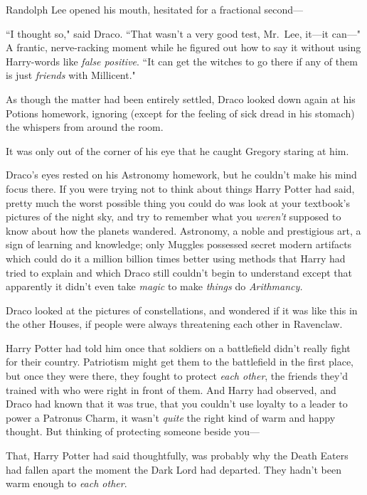 Randolph Lee opened his mouth, hesitated for a fractional second—

``I thought so," said Draco. ``That wasn't a very good test, Mr.~Lee, it—it can—" A frantic, nerve-racking moment while he figured out how to say it without using Harry-words like \emph{false positive}. ``It can get the witches to go there if any of them is just \emph{friends} with Millicent."

As though the matter had been entirely settled, Draco looked down again at his Potions homework, ignoring (except for the feeling of sick dread in his stomach) the whispers from around the room.

It was only out of the corner of his eye that he caught Gregory staring at him.

\later

Draco's eyes rested on his Astronomy homework, but he couldn't make his mind focus there. If you were trying not to think about things Harry Potter had said, pretty much the worst possible thing you could do was look at your textbook's pictures of the night sky, and try to remember what you \emph{weren't} supposed to know about how the planets wandered. Astronomy, a noble and prestigious art, a sign of learning and knowledge; only Muggles possessed secret modern artifacts which could do it a million billion times better using methods that Harry had tried to explain and which Draco still couldn't begin to understand except that apparently it didn't even take \emph{magic} to make \emph{things} do \emph{Arithmancy.}

Draco looked at the pictures of constellations, and wondered if it was like this in the other Houses, if people were always threatening each other in Ravenclaw.

Harry Potter had told him once that soldiers on a battlefield didn't really fight for their country. Patriotism might get them to the battlefield in the first place, but once they were there, they fought to protect \emph{each other}, the friends they'd trained with who were right in front of them. And Harry had observed, and Draco had known that it was true, that you couldn't use loyalty to a leader to power a Patronus Charm, it wasn't \emph{quite} the right kind of warm and happy thought. But thinking of protecting someone beside you—

That, Harry Potter had said thoughtfully, was probably why the Death Eaters had fallen apart the moment the Dark Lord had departed. They hadn't been warm enough to \emph{each other}.

